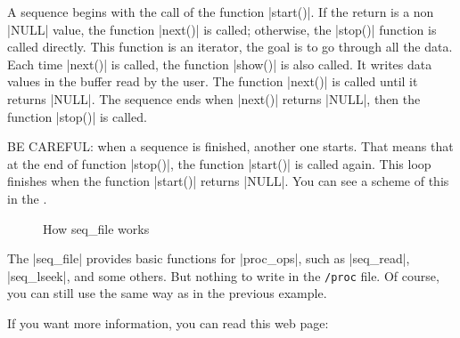 \documentclass[10pt, oneside]{book}
\begin{document}
A sequence begins with the call of the function \cpp|start()|.
If the return is a non \cpp|NULL| value, the function \cpp|next()| is called; otherwise, the \cpp|stop()| function is called directly.
This function is an iterator, the goal is to go through all the data.
Each time \cpp|next()| is called, the function \cpp|show()| is also called.
It writes data values in the buffer read by the user.
The function \cpp|next()| is called until it returns \cpp|NULL|.
The sequence ends when \cpp|next()| returns \cpp|NULL|, then the function \cpp|stop()| is called.

BE CAREFUL: when a sequence is finished, another one starts.
That means that at the end of function \cpp|stop()|, the function \cpp|start()| is called again.
This loop finishes when the function \cpp|start()| returns \cpp|NULL|.
You can see a scheme of this in the .

\begin{figure}[h]
  \center
  \caption{How seq\_file works}
  \label{img:seqfile}
\end{figure}

The \cpp|seq_file| provides basic functions for \cpp|proc_ops|, such as \cpp|seq_read|, \cpp|seq_lseek|, and some others.
But nothing to write in the \verb|/proc| file.
Of course, you can still use the same way as in the previous example.


If you want more information, you can read this web page:
\end{document}
